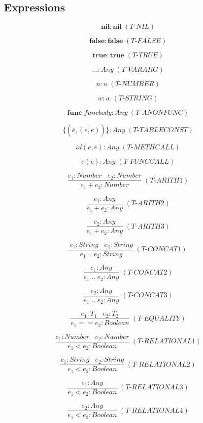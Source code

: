 \documentclass[12pt]{article}
\begin{document}
\subsection{Expressions}

\[
\textbf{nil} : \textbf{nil} \; (\textit{T-NIL})
\]

\[
\textbf{false} : \textbf{false} \; (\textit{T-FALSE})
\]

\[
\textbf{true} : \textbf{true} \; (\textit{T-TRUE})
\]

\[
{...} : Any \; (\textit{T-VARARG})
\]

\[
n : n \; (\textit{T-NUMBER})
\]

\[
w : w \; (\textit{T-STRING})
\]

\[
\textbf{func} \; funcbody : Any \; (\textit{T-ANONFUNC})
\]

\[
\{(\overline{e},\overline{(e,e)})\} : Any \; (\textit{T-TABLECONST})
\]

\[
id(e,\overline{e}) : Any \; (\textit{T-METHCALL})
\]

\[
e(\overline{e}) : Any \; (\textit{T-FUNCCALL})
\]

\[
\frac{e_{1}:Number \;\;\; e_{2}:Number}
     {e_{1} + e_{2} : Number} \; (\textit{T-ARITH1})
\]

\[
\frac{e_{1}:Any}
     {e_{1} + e_{2} : Any} \; (\textit{T-ARITH2})
\]

\[
\frac{e_{2}:Any}
     {e_{1} + e_{2} : Any} \; (\textit{T-ARITH3})
\]

\[
\frac{e_{1}:String \;\;\; e_{2}:String}
     {e_{1} \; {..} \; e_{2} : String} \; (\textit{T-CONCAT1})
\]

\[
\frac{e_{1}:Any}
     {e_{1} \; {..} \; e_{2} : Any} \; (\textit{T-CONCAT2})
\]

\[
\frac{e_{2}:Any}
     {e_{1} \; {..} \; e_{2} : Any} \; (\textit{T-CONCAT3})
\]

\[
\frac{e_{1}:T_{1} \;\;\; e_{2}:T_{2}}
     {e_{1} == e_{2} : Boolean} \; (\textit{T-EQUALITY})
\]

\[
\frac{e_{1}:Number \;\;\; e_{2}:Number}
     {e_{1} < e_{2} : Boolean} \; (\textit{T-RELATIONAL1})
\]

\[
\frac{e_{1}:String \;\;\; e_{2}:String}
     {e_{1} < e_{2} : Boolean} \; (\textit{T-RELATIONAL2})
\]

\[
\frac{e_{1}:Any}
     {e_{1} < e_{2} : Boolean} \; (\textit{T-RELATIONAL3})
\]

\[
\frac{e_{2}:Any}
     {e_{1} < e_{2} : Boolean} \; (\textit{T-RELATIONAL4})
\]
\end{document}
